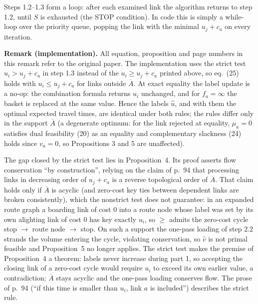 \documentclass[10pt]{article}
\begin{document}
\noindent Steps 1.2--1.3 form a loop: after each examined link the
algorithm returns to step 1.2, until $S$ is exhausted (the STOP
condition). In code this is simply a while-loop over the priority
queue, popping the link with the minimal $u_j + c_a$ on every
iteration.

\medskip
\noindent\textbf{Remark (implementation).} All equation, proposition
and page numbers in this remark refer to the original paper. The
implementation uses the strict test $u_i > u_j + c_a$ in step 1.3
instead of the $u_i \geq u_j + c_a$ printed above, so eq.~(25) holds
with $u_i \leq u_j + c_a$ for links outside $\overline{A}$. At exact
equality the label update is a no-op: the combination formula returns
$u_i$ unchanged, and for $f_a = \infty$ the basket is replaced at the
same value. Hence the labels $\hat{u}$, and with them the optimal
expected travel times, are identical under both rules; the rules differ
only in the support $\overline{A}$ (a degenerate optimum: for the link
rejected at equality, $\mu_a = 0$ satisfies dual feasibility (20) as an
equality and complementary slackness (24) holds since $v_a = 0$, so
Propositions 3 and 5 are unaffected).

The gap closed by the strict test lies in Proposition~4. Its proof
asserts flow conservation ``by construction'', relying on the claim of
p.~94 that processing links in decreasing order of $u_j + c_a$ is a
reverse topological order of $\overline{A}$. That claim holds only if
$\overline{A}$ is acyclic (and zero-cost key ties between dependent
links are broken consistently), which the nonstrict test does not
guarantee: in an expanded route graph a boarding link of cost $0$ into
a route node whose label was set by its own alighting link of cost $0$
has key exactly $u_i$, so $\geq$ admits the zero-cost cycle stop $\to$
route node $\to$ stop. On such a support the one-pass loading of step
2.2 strands the volume entering the cycle, violating conservation, so
$\hat{v}$ is not primal feasible and Proposition~5 no longer applies.
The strict test makes the premise of Proposition~4 a theorem: labels
never increase during part 1, so accepting the closing link of a
zero-cost cycle would require $u_i$ to exceed its own earlier value,
a contradiction; $\overline{A}$ stays acyclic and the one-pass loading
conserves flow. The prose of p.~94 (``if this time is smaller than
$u_i$, link $a$ is included'') describes the strict rule.
\end{document}
